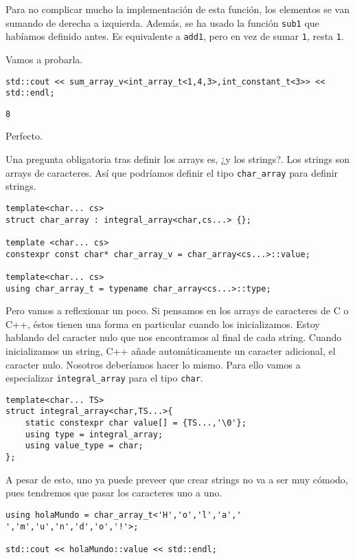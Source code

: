 \documentclass[11pt]{article}
\begin{document}
Para no complicar mucho la implementación de esta función, los elementos se van sumando de derecha a izquierda. Además, se ha usado la función \texttt{sub1} que habíamos definido antes. Es equivalente a \texttt{add1}, pero en vez de sumar \texttt{1}, resta \texttt{1}.

Vamos a probarla.

\begin{verbatim}
std::cout << sum_array_v<int_array_t<1,4,3>,int_constant_t<3>> << std::endl;
\end{verbatim}

\begin{verbatim}
8
\end{verbatim}


Perfecto.

Una pregunta obligatoria tras definir los arrays es, ¿y los strings?. Los strings son arrays de caracteres. Así que podríamos definir el tipo \texttt{char\_array} para definir strings.

\begin{verbatim}
template<char... cs>
struct char_array : integral_array<char,cs...> {};

template <char... cs>
constexpr const char* char_array_v = char_array<cs...>::value;

template<char... cs>
using char_array_t = typename char_array<cs...>::type;
\end{verbatim}

Pero vamos a reflexionar un poco. Si pensamos en los arrays de caracteres de C o C++, éstos tienen una forma en particular cuando los inicializamos. Estoy hablando del caracter nulo que nos encontramos al final de cada string. Cuando inicializamos un string, C++ añade automáticamente un caracter adicional, el caracter nulo. Nosotros deberíamos hacer lo mismo. Para ello vamos a especializar \texttt{integral\_array} para el tipo \texttt{char}.

\begin{verbatim}
template<char... TS>
struct integral_array<char,TS...>{
	static constexpr char value[] = {TS...,'\0'};
	using type = integral_array;
	using value_type = char;
};
\end{verbatim}

A pesar de esto, uno ya puede preveer que crear strings no va a ser muy cómodo, pues tendremos que pasar los caracteres uno a uno.

\begin{verbatim}
using holaMundo = char_array_t<'H','o','l','a',' ','m','u','n','d','o','!'>;

std::cout << holaMundo::value << std::endl;
\end{verbatim}
\end{document}
